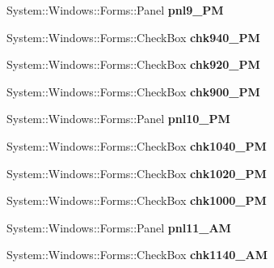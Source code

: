 \begin{DoxyCompactItemize}
System\+::\+Windows\+::\+Forms\+::\+Panel {\bfseries pnl9\+\_\+PM}
\item 
\mbox{\label{class_project1_1_1_my_form_ac1dd0ca86802d467b7a39d85243280b1}} 
System\+::\+Windows\+::\+Forms\+::\+Check\+Box {\bfseries chk940\+\_\+PM}
\item 
\mbox{\label{class_project1_1_1_my_form_ac585a630a9a4bde2ac063116a4c0822a}} 
System\+::\+Windows\+::\+Forms\+::\+Check\+Box {\bfseries chk920\+\_\+PM}
\item 
\mbox{\label{class_project1_1_1_my_form_a1a2cecf607f61afcfd15a58e4167350e}} 
System\+::\+Windows\+::\+Forms\+::\+Check\+Box {\bfseries chk900\+\_\+PM}
\item 
\mbox{\label{class_project1_1_1_my_form_a74c79eb33010203461787677f50d79c8}} 
System\+::\+Windows\+::\+Forms\+::\+Panel {\bfseries pnl10\+\_\+PM}
\item 
\mbox{\label{class_project1_1_1_my_form_a585fbdc02adb5110ce857351fc151e0f}} 
System\+::\+Windows\+::\+Forms\+::\+Check\+Box {\bfseries chk1040\+\_\+PM}
\item 
\mbox{\label{class_project1_1_1_my_form_a440d7a6d22b9449898d704cb9abe8f12}} 
System\+::\+Windows\+::\+Forms\+::\+Check\+Box {\bfseries chk1020\+\_\+PM}
\item 
\mbox{\label{class_project1_1_1_my_form_a77f2b46afd319f9ce1adc75b3f686b7b}} 
System\+::\+Windows\+::\+Forms\+::\+Check\+Box {\bfseries chk1000\+\_\+PM}
\item 
\mbox{\label{class_project1_1_1_my_form_a864c1f15ecc50064c6059b672a5d080d}} 
System\+::\+Windows\+::\+Forms\+::\+Panel {\bfseries pnl11\+\_\+AM}
\item 
\mbox{\label{class_project1_1_1_my_form_afe00f2e5b18d72d310defc9fefdfeda3}} 
System\+::\+Windows\+::\+Forms\+::\+Check\+Box {\bfseries chk1140\+\_\+AM}
\item 

\end{DoxyCompactItemize}
